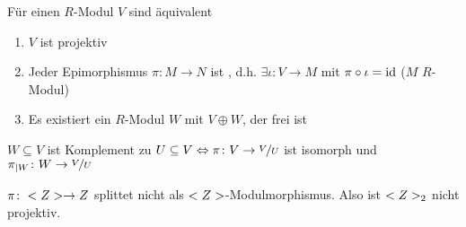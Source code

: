 \begin{proposition}
	Für einen $R$-Modul $V$ sind äquivalent
	\begin{enumerate}
		\item $V$ ist projektiv
		\item Jeder Epimorphismus $\pi\colon M \to N$ ist , d.h. $\exists \iota \colon V \to M$ mit $\pi \circ \iota = \operatorname{id}$ ($M$ $R$-Modul)
		\item Es existiert ein $R$-Modul $W$ mit $V \oplus W$, der frei ist
	\end{enumerate}
\end{proposition}
\begin{remark}
	$W \subseteq V$ ist Komplement zu $U \subseteq V \Leftrightarrow \pi \colon V \to \lnkset{V}{U}$ ist isomorph und $\pi_{\mid W}\colon W \to \lnkset{V}{U}$
\end{remark}
\begin{example}
	$\pi \colon <Z> \to Z$ splittet nicht als $<Z>$-Modulmorphismus. Also ist $<Z>_2$ nicht projektiv.
\end{example}
